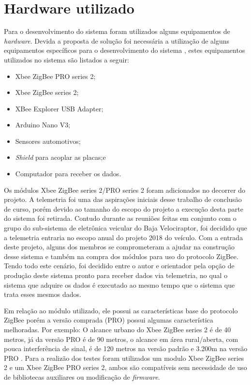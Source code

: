 \section{Hardware utilizado}
\label{sec:hardwareutilizado}

Para o desenvolvimento do sistema foram utilizados alguns equipamentos de \textit{hardware}. Devida a proposta de solução foi necessária a utilização de alguns equipamentos específicos para o desenvolvimento do sistema , estes equipamentos utilizados no sistema são listados a seguir:

\begin{itemize}
	\item Xbee ZigBee PRO series 2;
	\item Xbee ZigBee series 2;
	\item XBee Explorer USB Adapter;
	\item Arduino Nano V3;
	\item Sensores automotivos;
	\item \textit{Shield} para acoplar as placas;e
	\item Computador para receber os dados. 
\end{itemize}  

Os módulos Xbee ZigBee series 2/PRO series 2 \cite{xbeeuserguide} foram adicionados no decorrer do projeto. A telemetria foi uma das aspirações iniciais desse trabalho de conclusão de curso, porém devido ao tamanho do escopo do projeto a execução desta parte do sistema foi retirada. Contudo durante as reuniões feitas em conjunto com o grupo do sub-sistema de eletrônica veicular do Baja Velociraptor, foi decidido que a telemetria entraria no escopo anual do projeto 2018 do veículo. Com a entrada deste projeto, alguns dos membros se comprometeram a ajudar na construção desse sistema e também na compra dos módulos para uso do protocolo ZigBee. Tendo todo este cenário, foi decidido entre o autor e orientador pela opção de produção deste sistema pronto para receber dados via telemetria, no qual o sistema que adquire os dados é executado ao mesmo tempo que o sistema que trata esses mesmos dados. 

Em relação ao módulo utilizado, ele possui as características base do protocolo ZigBee porém a versão comprada (PRO) possui algumas característica melhoradas. Por exemplo: O alcance urbano do Xbee ZigBee series 2 é de 40 metros, já da versão PRO é de 90 metros, o alcance em área rural/aberta, com pouca interferência de sinal, é de 120 metros na versão padrão e 3.200m na versão PRO \cite{xbeespecs}. Para a realizão dos testes foram utilizados um modulo Xbee ZigBee series 2 e um Xbee ZigBee PRO series 2, ambos são compatíveis sem necessidade de uso de bibliotecas auxiliares ou modificação de \textit{firmware}.

